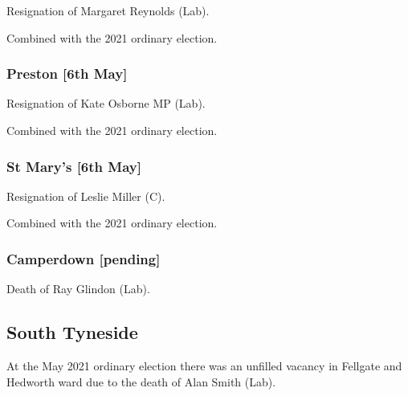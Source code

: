 \documentclass[a4paper,openany]{book}
\begin{document}
\begin{resultsiii}

Resignation of Margaret Reynolds (Lab).

Combined with the 2021 ordinary election.

\subsubsection*{Preston \hspace*{\fill}\nolinebreak[1]%
	\enspace\hspace*{\fill}
	[6th May]}


Resignation of Kate Osborne MP (Lab).

Combined with the 2021 ordinary election.

\subsubsection*{St Mary's \hspace*{\fill}\nolinebreak[1]%
	\enspace\hspace*{\fill}
	[6th May]}


Resignation of Leslie Miller (C).

Combined with the 2021 ordinary election.

\subsubsection*{Camperdown \hspace*{\fill}\nolinebreak[1]%
	\enspace\hspace*{\fill}
	[pending]}


Death of Ray Glindon (Lab).

\subsection*{South Tyneside}

At the May 2021 ordinary election there was an unfilled vacancy in Fellgate and Hedworth ward due to the death of Alan Smith (Lab).


\end{resultsiii}
\end{document}
